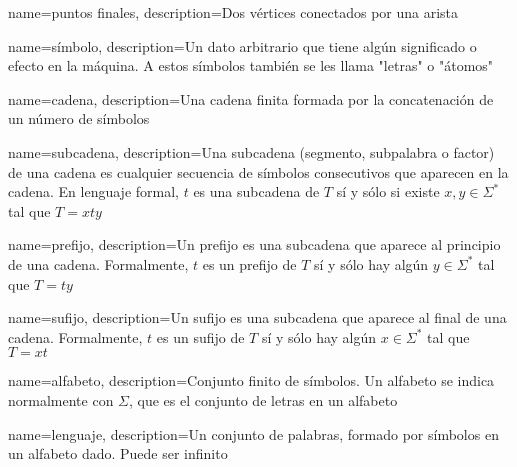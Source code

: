 

{
	name=puntos finales,
	description={Dos vértices conectados por una arista}
}

{
	name=símbolo,
	description={Un dato arbitrario que tiene algún significado o efecto en la máquina. A estos símbolos también se les llama "letras" o "átomos"}
}

{
	name=cadena,
	description={Una cadena finita formada por la concatenación de un número de símbolos}
}

{
	name=subcadena,
	description={Una subcadena (segmento, subpalabra o factor) de una cadena es cualquier secuencia de símbolos consecutivos que aparecen en la cadena. En lenguaje formal, $t$ es una subcadena de $T$ sí y sólo si existe $x, y \in \Sigma^\ast$ tal que $T = xty$
	}
}

{
	name=prefijo,
	description={Un prefijo es una subcadena que aparece al principio de una cadena. Formalmente, $t$ es un prefijo de $T$ sí y sólo hay algún $y \in \Sigma^\ast$ tal que $T = ty$}
}

{
	name=sufijo,
	description={Un sufijo es una subcadena que aparece al final de una cadena. Formalmente, $t$ es un sufijo de $T$ sí y sólo hay algún $x \in \Sigma^\ast$ tal que $T = xt$}
}


{
	name=alfabeto,
	description={Conjunto finito de símbolos. Un alfabeto se indica normalmente con $\Sigma$, que es el conjunto de letras en un alfabeto}
}

{
	name=lenguaje,
	description={Un conjunto de palabras, formado por símbolos en un alfabeto dado. Puede ser infinito}
}


